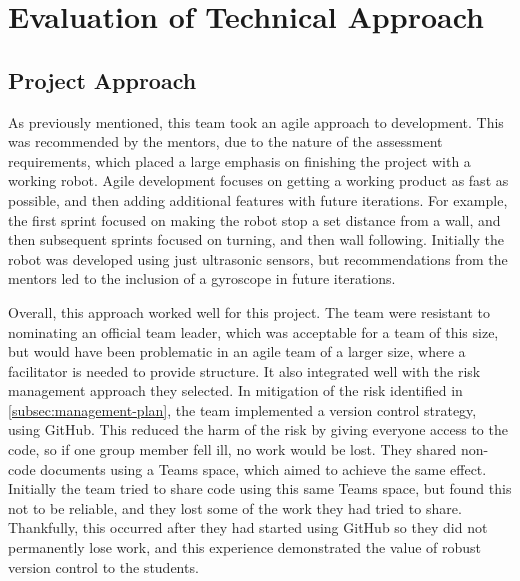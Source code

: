 


\section{Evaluation of Technical Approach}\label{sec:technical}
    \subsection{Project Approach}\label{subsec:technical-project_aproach}
        As previously mentioned, this team took an agile approach to development.
        This was recommended by the mentors, due to the nature of the assessment requirements, which placed a large emphasis on finishing the project with a working robot.
        Agile development focuses on getting a working product as fast as possible, and then adding additional features with future iterations.
        For example, the first sprint focused on making the robot stop a set distance from a wall, and then subsequent sprints focused on turning, and then wall following.
        Initially the robot was developed using just ultrasonic sensors, but recommendations from the mentors led to the inclusion of a gyroscope in future iterations.

        Overall, this approach worked well for this project.
        The team were resistant to nominating an official team leader, which was acceptable for a team of this size, but would have been problematic in an agile team of a larger size, where a facilitator is needed to provide structure.
        It also integrated well with the risk management approach they selected.
        In mitigation of the risk identified in \autoref{subsec:management-plan}, the team implemented a version control strategy, using GitHub.
        This reduced the harm of the risk by giving everyone access to the code, so if one group member fell ill, no work would be lost.
        They shared non-code documents using a Teams space, which aimed to achieve the same effect.
        Initially the team tried to share code using this same Teams space, but found this not to be reliable, and they lost some of the work they had tried to share.
        Thankfully, this occurred after they had started using GitHub so they did not permanently lose work, and this experience demonstrated the value of robust version control to the students.

